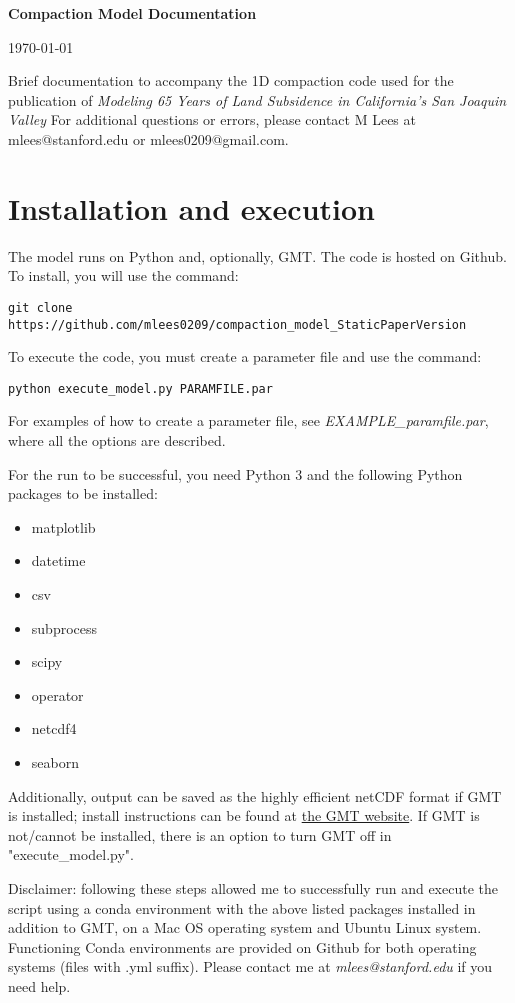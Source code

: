 \documentclass{article}
\begin{document}
\LARGE\textbf{Compaction Model Documentation}
\normalsize

\today
\author{Matt Lees\n mlees0209@gmail.com}

\abstract Brief documentation to accompany the 1D compaction code used for the publication of \textit{Modeling 65 Years of Land Subsidence in California’s San Joaquin Valley} For additional questions or errors, please contact M Lees at mlees@stanford.edu or mlees0209@gmail.com.

\tableofcontents

\section{Installation and execution}

The model runs on Python and, optionally, GMT. The code is hosted on Github. To install, you will use the command:

\verb|git clone https://github.com/mlees0209/compaction_model_StaticPaperVersion|

To execute the code, you must create a parameter file and use the command:

\verb|python execute_model.py PARAMFILE.par|

For examples of how to create a parameter file, see \textit{EXAMPLE\_paramfile.par}, where all the options are described.

For the run to be successful, you need Python 3 and the following Python packages to be installed:
\begin{itemize}
\item matplotlib
\item datetime
\item csv
\item subprocess
\item scipy
\item operator
\item netcdf4
\item seaborn
\end{itemize}

Additionally, output can be saved as the highly efficient netCDF format if GMT is installed; install instructions can be found at  \href{https://www.generic-mapping-tools.org/}{the GMT website}. If GMT is not/cannot be installed, there is an option to turn GMT off in "execute\_model.py".

Disclaimer: following these steps allowed me to successfully run and execute the script using a conda environment with the above listed packages installed in addition to GMT, on a Mac OS operating system and Ubuntu Linux system. Functioning Conda environments are provided on Github for both operating systems (files with .yml suffix). Please contact me at \textit{mlees@stanford.edu} if you need help.
\end{document}
